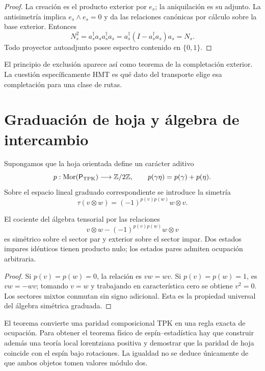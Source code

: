 \begin{proof}
La creación es el producto exterior por \(e_s\); la aniquilación es su
adjunto. La antisimetría implica \(e_s\wedge e_s=0\) y da las relaciones
canónicas por cálculo sobre la base exterior. Entonces
\[
N_s^2=a_s^\dagger a_sa_s^\dagger a_s
=a_s^\dagger(I-a_s^\dagger a_s)a_s=N_s.
\]
Todo proyector autoadjunto posee espectro contenido en \(\{0,1\}\).
\end{proof}

El principio de exclusión aparece así como teorema de la completación
exterior. La cuestión específicamente HMT es qué dato del transporte elige
esa completación para una clase de rutas.

\section{Graduación de hoja y álgebra de intercambio}

Supongamos que la hoja orientada define un carácter aditivo
\[
 p:\operatorname{Mor}(\mathsf P_{\rm TPK})\longrightarrow\mathbb Z/2\mathbb Z,
 \qquad p(\gamma\eta)=p(\gamma)+p(\eta).
\]
Sobre el espacio lineal graduado correspondiente se introduce la simetría
\[
 \tau(v\otimes w)=(-1)^{p(v)p(w)}w\otimes v.
\]

\begin{theorem}
El cociente del álgebra tensorial por las relaciones
\[
 v\otimes w-(-1)^{p(v)p(w)}w\otimes v
\]
es simétrico sobre el sector par y exterior sobre el sector impar. Dos estados
impares idénticos tienen producto nulo; los estados pares admiten ocupación
arbitraria.
\end{theorem}

\begin{proof}
Si \(p(v)=p(w)=0\), la relación es \(vw=wv\). Si
\(p(v)=p(w)=1\), es \(vw=-wv\); tomando \(v=w\) y trabajando en
característica cero se obtiene \(v^2=0\). Los sectores mixtos conmutan sin
signo adicional. Esta es la propiedad universal del álgebra simétrica
graduada.
\end{proof}

El teorema convierte una paridad composicional TPK en una regla exacta de
ocupación. Para obtener el teorema físico de espín--estadística hay que
construir además una teoría local lorentziana positiva y demostrar que la
paridad de hoja coincide con el espín bajo rotaciones. La igualdad no se
deduce únicamente de que ambos objetos tomen valores módulo dos.

